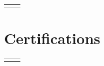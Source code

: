 \documentclass[11pt, letterpaper]{resume}
\begin{document}
\begin{paracol}{2}
\begin{supertabular}{rl}

\end{supertabular}


\section*{Certifications}
\begin{supertabular}{rl}


\end{supertabular}






\end{paracol}
\end{document}
